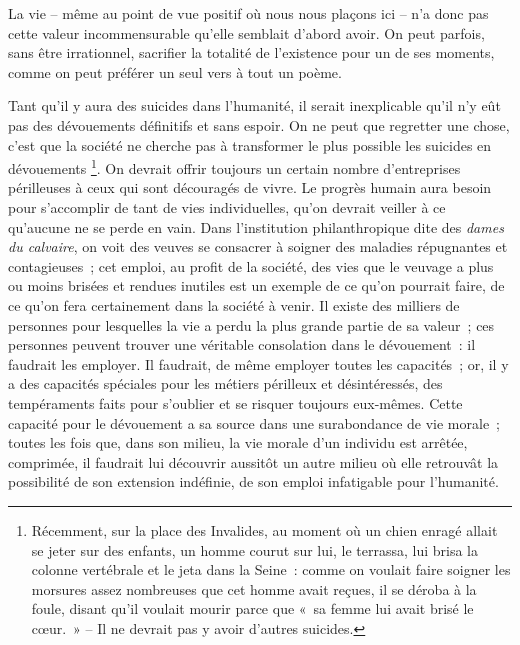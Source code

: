 \documentclass[french,twoside]{book} %
\begin{document}
La vie – même au point de vue positif où nous nous plaçons ici – n’a donc pas cette valeur incommensurable qu’elle semblait d’abord avoir. On peut parfois, sans être irrationnel, sacrifier la totalité de l’existence pour un de ses moments, comme on peut préférer un seul vers à tout un poème.\par
Tant qu’il y aura des suicides dans l’humanité, il serait inexplicable qu’il n’y eût pas des dévouements définitifs et sans espoir. On ne peut que regretter une chose, c’est que la société ne cherche pas à transformer le plus possible les suicides en dévouements \footnote{Récemment, sur la place des Invalides, au moment où un chien enragé allait se jeter sur des enfants, un homme courut sur lui, le terrassa, lui brisa la colonne vertébrale et le jeta dans la Seine : comme on voulait faire soigner les morsures assez nombreuses que cet homme avait reçues, il se déroba à la foule, disant qu’il voulait mourir parce que « sa femme lui avait brisé le cœur. » – Il ne devrait pas y avoir d’autres suicides.}. On devrait offrir toujours un certain nombre d’entreprises périlleuses à ceux qui sont découragés de vivre. Le progrès humain aura besoin pour s’accomplir de tant de vies individuelles, qu’on devrait veiller à ce qu’aucune ne se perde en vain. Dans l’institution philanthropique dite des \emph{dames du calvaire}, on voit des veuves se consacrer à soigner des maladies répugnantes et contagieuses ; cet emploi, au profit de la société, des vies que le veuvage a plus ou moins brisées et rendues inutiles est un exemple de ce qu’on pourrait faire, de ce qu’on fera certainement dans la société à venir. Il existe des milliers de personnes pour lesquelles la vie a perdu la plus grande partie de sa valeur ; ces personnes peuvent trouver une véritable consolation dans le dévouement : il faudrait les employer. Il faudrait, de même employer toutes les capacités ; or, il y a des capacités spéciales pour les métiers périlleux et désintéressés, des tempéraments faits pour s’oublier et se risquer toujours eux-mêmes. Cette capacité pour le dévouement a sa source dans une surabondance de vie morale ; toutes les fois que, dans son milieu, la vie morale d’un individu est arrêtée, comprimée, il faudrait lui découvrir aussitôt un autre milieu où elle retrouvât la possibilité de son extension indéfinie, de son emploi infatigable pour l’humanité.\par
\end{document}
